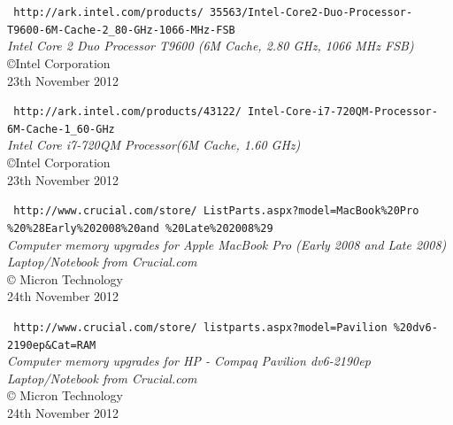 \documentclass[twoside]{article}
\begin{document}
\begin{multicols}{2}
\begin{thebibliography}{99}
	\texttt{\small
	http://ark.intel.com/products/ 35563/Intel-Core2-Duo-Processor- T9600-6M-Cache-2\_80-GHz-1066-MHz-FSB}	\\
	\emph{Intel{\textregistered} Core {\texttrademark} 2 Duo Processor T9600 (6M Cache, 2.80 GHz, 1066 MHz FSB)}	\\
	{\copyright}Intel Corporation	\\
	23th November 2012

	\texttt{\small
	http://ark.intel.com/products/43122/ Intel-Core-i7-720QM-Processor- 6M-Cache-1\_60-GHz}	\\
	\emph{Intel{\textregistered} Core {\texttrademark} i7-720QM Processor(6M Cache, 1.60 GHz)}	\\
	{\copyright}Intel Corporation	\\
	23th November 2012

	\texttt{\small
	http://www.crucial.com/store/ ListParts.aspx?model=MacBook\%20Pro \%20\%28Early\%202008\%20and \%20Late\%202008\%29}	\\
	\emph{Computer memory upgrades for Apple MacBook Pro (Early 2008 and Late 2008) Laptop/Notebook from Crucial.com }	\\
	{\copyright} Micron Technology	\\
	24th November 2012

	\texttt{\small
	http://www.crucial.com/store/ listparts.aspx?model=Pavilion \%20dv6-2190ep\&Cat=RAM}	\\
	\emph{Computer memory upgrades for HP - Compaq Pavilion dv6-2190ep Laptop/Notebook from Crucial.com}	\\
	{\copyright} Micron Technology	\\
	24th November 2012	 
\end{thebibliography}


\end{multicols}
\end{document}
